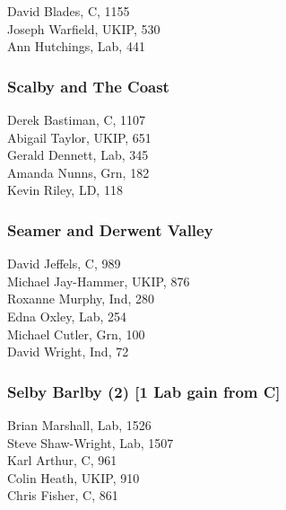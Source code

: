 \documentclass[a4paper,openany,10pt]{book}
\begin{document}


David Blades, C, 1155\\
Joseph Warfield, UKIP, 530\\
Ann Hutchings, Lab, 441\\


\subsubsection*{Scalby and The Coast}



Derek Bastiman, C, 1107\\
Abigail Taylor, UKIP, 651\\
Gerald Dennett, Lab, 345\\
Amanda Nunns, Grn, 182\\
Kevin Riley, LD, 118\\


\subsubsection*{Seamer and Derwent Valley}



David Jeffels, C, 989\\
Michael Jay-Hammer, UKIP, 876\\
Roxanne Murphy, Ind, 280\\
Edna Oxley, Lab, 254\\
Michael Cutler, Grn, 100\\
David Wright, Ind, 72\\


\subsubsection*{Selby Barlby (2) \hspace*{\fill}\nolinebreak[1]%
\enspace\hspace*{\fill}
[1 Lab gain from C]}



Brian Marshall, Lab, 1526\\
Steve Shaw-Wright, Lab, 1507\\
Karl Arthur, C, 961\\
Colin Heath, UKIP, 910\\
Chris Fisher, C, 861\\
\end{document}
